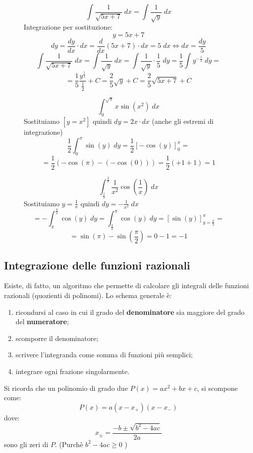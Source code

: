 \documentclass[a4paper]{article}
\theoremstyle{break}
\theoremstyle{break}
\theoremstyle{break}
\theoremstyle{break}
\begin{document}
\begin{figure}[H]
  \begin{example}
    \[
      \int \frac{1}{\sqrt{5x + 7} }\;dx = \int \frac{1}{\sqrt{y} }\;dx
    \] 
    Integrazione per sostituzione:
    \[
      y = 5x + 7
    \] 
    \[
      dy = \frac{dy}{dx} \cdot dx = \frac{d}{dx} (5x + 7) \cdot  dx = 5\;dx \Leftrightarrow dx = \frac{dy}{5}
    \] 
    \[
      \int \frac{1}{\sqrt{5x + 7} }\;dx = \int \frac{1}{\sqrt{y} }\;dx = \int \frac{1}{\sqrt{y} } \cdot \frac{1}{5}\; dy = \frac{1}{5} \int y^{-\frac{1}{2}} \;dy =
    \] 
    \[
      = \frac{1}{5} \frac{y^{\frac{1}{2}}}{\frac{1}{2}} + C = \frac{2}{5} \sqrt{y} + C = \frac{2}{5} \sqrt{5x + 7} + C
    \] 
  \end{example}
\end{figure}

\begin{figure}[H]
  \begin{example}
    \[
      \int_{0}^{\sqrt{\pi } } x \sin(x^2)\;dx
    \] 
    Sostituiamo \( \left[ y=x^2 \right]  \) quindi \( dy = 2x \cdot dx \) (anche gli estremi di integrazione)
    \[
      \frac{1}{2} \int_{0}^{\pi } \sin(y)\;dy = \frac{1}{2} \left[ -\cos(y) \right]_{0}^{\pi } = 
    \] 
    \[
      = \frac{1}{2} (-\cos(\pi ) - (-\cos(0))) = \frac{1}{2} (+1 + 1) = 1
    \] 
  \end{example}
\end{figure}

\begin{figure}[H]
  \begin{example}
    \[
      \int_{\frac{1}{\pi }}^{\frac{2}{\pi }} \frac{1}{x^2} \cos(\frac{1}{x})\;dx
    \] 
    Sostituiamo \( y = \frac{1}{x} \) quindi \( dy = -\frac{1}{x^2}\;dx \) 
    \[
      = - \int_{\pi }^{\frac{\pi }{2}} \cos(y)\;dy =  \int_{\frac{\pi }{2}}^{\pi } \cos(y)\;dy = \left[ \sin(y) \right]_{y=\frac{\pi }{2}}^{\pi } =
    \] 
    \[
      = \sin(\pi ) - \sin(\frac{\pi }{2}) = 0 - 1 = -1
    \] 
  \end{example}
\end{figure}

\subsection{Integrazione delle funzioni razionali}
Esiste, di fatto, un algoritmo che permette di calcolare gli integrali delle funzioni razionali
(quozienti di polinomi). Lo schema generale è:
\begin{enumerate}
  \item ricondursi al caso in cui il grado del \textbf{denominatore} sia maggiore del grado
    del \textbf{numeratore};
  \item scomporre il denominatore;
  \item scrivere l'integranda come somma di funzioni più semplici;
  \item integrare ogni frazione singolarmente.
\end{enumerate}
Si ricorda che un polinomio di grado due \( P(x) =ax^2 + bx + c \), si scompone come:
\[
  P(x) = a(x-x_+)(x-x_-)
\] 
dove:
\[
  x_{\pm} = \frac{-b \pm \sqrt{b^2 - 4ac}}{2a}
\] 
sono gli zeri di \( P \). (Purchè \( b^2 - 4ac \ge 0\) )
\end{document}
